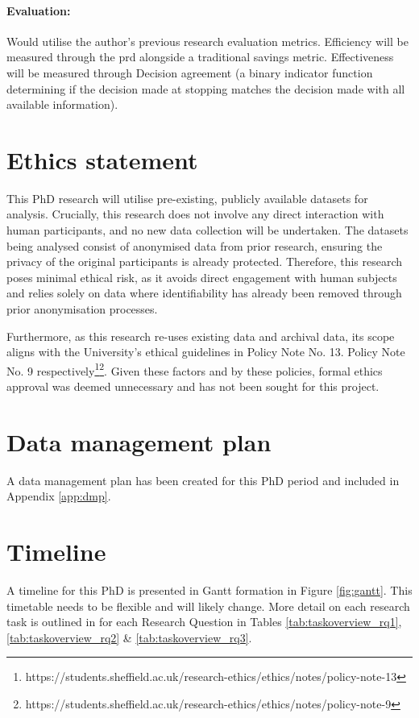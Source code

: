 \documentclass[10pt,oneside]{book}
\begin{document}
\paragraph{Evaluation:}
Would utilise the author's previous research evaluation metrics. Efficiency will be measured through the \gls*{prd}  alongside a traditional savings metric. Effectiveness will be measured through Decision agreement (a binary indicator function determining if the decision made at stopping matches the decision made with all available information). 




\section{Ethics statement}\label{sec:ethics}

This PhD research will utilise pre-existing, publicly available datasets for analysis. Crucially, this research does not involve any direct interaction with human participants, and no new data collection will be undertaken. The datasets being analysed consist of anonymised data from prior research, ensuring the privacy of the original participants is already protected. Therefore, this research poses minimal ethical risk, as it avoids direct engagement with human subjects and relies solely on data where identifiability has already been removed through prior anonymisation processes.

Furthermore, as this research re-uses existing data and archival data, its scope aligns with the University's ethical guidelines in Policy Note No. 13. Policy Note No. 9 respectively\footnote{https://students.sheffield.ac.uk/research-ethics/ethics/notes/policy-note-13}\footnote{https://students.sheffield.ac.uk/research-ethics/ethics/notes/policy-note-9}. Given these factors and by these policies, formal ethics approval was deemed unnecessary and has not been sought for this project.
\section{Data management plan}

A data management plan has been created for this PhD period and included in Appendix \ref{app:dmp}.


\section{Timeline}

A timeline for this PhD is presented in Gantt formation in Figure \ref{fig:gantt}. This timetable needs to be flexible and will likely change. More detail on each research task is outlined in for each Research Question in Tables \ref{tab:taskoverview_rq1}, \ref{tab:taskoverview_rq2} \& \ref{tab:taskoverview_rq3}.
\end{document}
